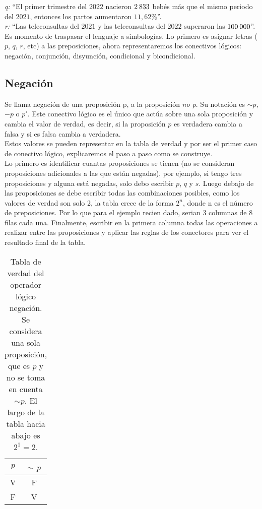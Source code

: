 \noindent\textit{q:} ``El primer trimestre del $2022$ nacieron $2\hspace{2px}833$ bebés más que el mismo periodo del $2021$, entonces los partos aumentaron $11,62\%$''.\\

\noindent\textit{r:} ``Las teleconsultas del $2021$ y las teleconsultas del $2022$ superaron las $100\hspace{2px}000$''.\\

Es momento de traspasar el lenguaje a simbologías. Lo primero es asignar letras ($p$, $q$, $r$, etc) a las preposiciones, ahora representaremos los conectivos lógicos: negación, conjunción, disyunción, condicional y bicondicional.

\subsection{Negación}
Se llama negación de una proposición p, a la proposición \textit{no p}. Su notación es $\sim p$, $-p$ o $p'$. Este conectivo lógico es el único que actúa sobre una sola proposición y cambia el valor de verdad, es decir, si la proposición $p$ es verdadera cambia a falsa y si es falsa cambia a verdadera. \\

Estos valores se pueden representar en la tabla de verdad y por ser el primer caso de conectivo lógico, explicaremos el paso a paso como se construye.\\

Lo primero es identificar cuantas proposiciones se tienen (no se consideran proposiciones adicionales a las que están negadas), por ejemplo, si tengo tres proposiciones y alguna está negadas, solo debo escribir $p$, $q$ y $s$. Luego debajo de las proposiciones se debe escribir todas las combinaciones posibles, como los valores de verdad son solo 2, la tabla crece de la forma $2^{n}$, donde n es el número de preposiciones.  Por lo que para el ejemplo recien dado, serian 3 columnas de 8 filas cada una. Finalmente, escribir en la primera columna todas las operaciones a realizar entre las proposiciones y aplicar las reglas de los conectores para ver el resultado final de la tabla.\\

\begin{table}[h!]
	\begin{center}
		\begin{tabular}{|c|c|}
\hline
$p$&$\sim$ $p$\\
\hline
V&F\\
\hline
F&V\\
\hline
		\end{tabular}
	\end{center}
\caption[Tabla de verdad del operador lógico negación.]{Tabla de verdad del operador lógico negación. Se considera una sola proposición, que es $p$ y no se toma en cuenta $\sim p$. El largo de la tabla hacia abajo es $2^{1}=2$.}
\end{table}

